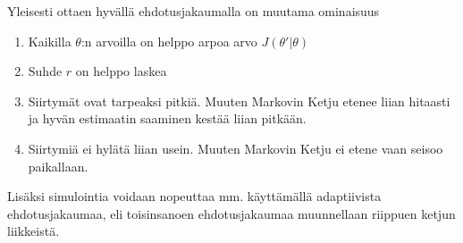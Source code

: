 Yleisesti ottaen hyvällä ehdotusjakaumalla on muutama ominaisuus\cite{gelman_andrew_bayesian_nodate}
\begin{enumerate}
	\item Kaikilla $\theta$:n arvoilla on helppo arpoa arvo $J(\theta'|\theta)$
	\item Suhde $r$ on helppo laskea
	\item Siirtymät ovat tarpeaksi pitkiä. Muuten Markovin Ketju etenee liian hitaasti ja hyvän estimaatin saaminen kestää liian pitkään.
	\item Siirtymiä ei hylätä liian usein. Muuten Markovin Ketju ei etene vaan seisoo paikallaan.
\end{enumerate}

Lisäksi simulointia voidaan nopeuttaa mm. käyttämällä adaptiivista ehdotusjakaumaa, eli toisinsanoen ehdotusjakaumaa muunnellaan riippuen ketjun liikkeistä. 

















